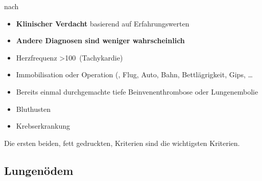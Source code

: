 {
nach \cite{Wells2000}

\begin{itemize}
  \item {\bfseries Klinischer Verdacht} basierend auf
  Erfahrungswerten
  \item {\bfseries Andere Diagnosen sind weniger
  wahrscheinlich}
  \item Herzfrequenz \textgreater 100\,
  (Tachykardie)
  \item Immobilisation oder Operation  (, Flug, Auto,
  Bahn, Bettlägrigkeit, Gips, {\dots}
  \item Bereits einmal durchgemachte tiefe
  Beinvenenthrombose oder Lungenembolie
  \item Bluthusten
  \item Krebserkrankung 
\end{itemize}

Die ersten beiden, fett gedruckten, Kriterien sind die
wichtigsten Kriterien. 
}{

}{}{}{}

\paragraph{}



\subsection{Lungenödem}\label{topic:lungenoedem}

\nopagebreak

